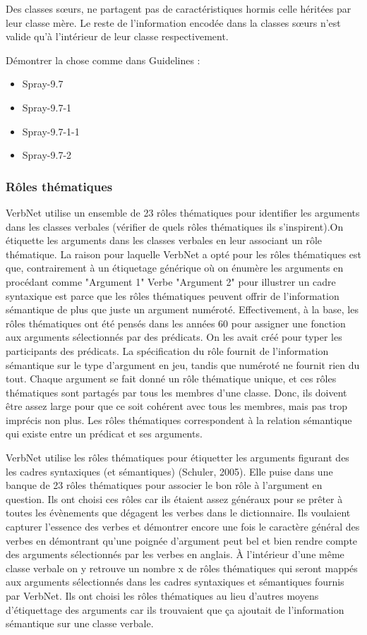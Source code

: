Des classes sœurs, ne partagent pas de caractéristiques hormis celle héritées par leur classe mère. Le reste de l'information encodée dans la classes sœurs n'est valide qu'à l'intérieur de leur classe respectivement.

Démontrer la chose comme dans Guidelines :

\begin{itemize}
\item Spray-9.7
	\item Spray-9.7-1
		\item Spray-9.7-1-1
	\item Spray-9.7-2
\end{itemize}

\subsubsection{Rôles thématiques}

VerbNet utilise un ensemble de 23 rôles thématiques pour identifier les arguments dans les classes verbales (vérifier de quels rôles thématiques ils s'inspirent).On étiquette les arguments dans les classes verbales en leur associant un rôle thématique. La raison pour laquelle VerbNet a opté pour les rôles thématiques est que, contrairement à un étiquetage générique où on énumère les arguments en procédant comme "Argument 1" Verbe "Argument 2" pour illustrer un cadre syntaxique est parce que les rôles thématiques peuvent offrir de l'information sémantique de plus que juste un argument numéroté. Effectivement, à la base, les rôles thématiques ont été pensés dans les années 60 pour assigner une fonction aux arguments sélectionnés par des prédicats. On les avait créé pour typer les participants des prédicats. La spécification du rôle fournit de l'information sémantique sur le type d'argument en jeu, tandis que numéroté ne fournit rien du tout. Chaque argument se fait donné un rôle thématique unique, et ces rôles thématiques sont partagés par tous les membres d'une classe. Donc, ils doivent être assez large pour que ce soit cohérent avec tous les membres, mais pas trop imprécis non plus. Les rôles thématiques correspondent à la relation sémantique qui existe entre un prédicat et ses arguments.

VerbNet utilise les rôles thématiques pour étiquetter les arguments figurant des les cadres syntaxiques (et sémantiques) (Schuler, 2005). Elle puise dans une banque de 23 rôles thématiques pour associer le bon rôle à l'argument en question. Ils ont choisi ces rôles car ils étaient assez généraux pour se prêter à toutes les évènements que dégagent les verbes dans le dictionnaire. Ils voulaient capturer l'essence des verbes et démontrer encore une fois le caractère général des verbes en démontrant qu'une poignée d'argument peut bel et bien rendre compte des arguments sélectionnés par les verbes en anglais. À l'intérieur d'une même classe verbale on y retrouve un nombre x de rôles thématiques qui seront mappés aux arguments sélectionnés dans les cadres syntaxiques et sémantiques fournis par VerbNet. Ils ont choisi les rôles thématiques au lieu d'autres moyens d'étiquettage des arguments car ils trouvaient que ça ajoutait de l'information sémantique sur une classe verbale. 

